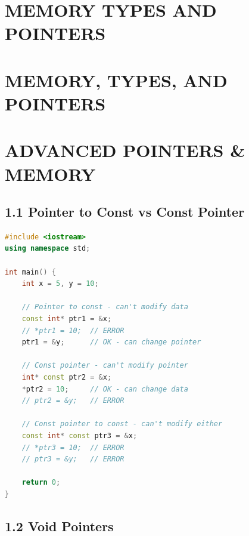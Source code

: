 \hypertarget{memory-types-and-pointers}{%
\chapter{MEMORY TYPES AND POINTERS}\label{memory-types-and-pointers}}

\hypertarget{memory-types-and-pointers-1}{%
\chapter{MEMORY, TYPES, AND
POINTERS}\label{memory-types-and-pointers-1}}

\hypertarget{advanced-pointers-memory}{%
\chapter{ADVANCED POINTERS \& MEMORY}\label{advanced-pointers-memory}}

\hypertarget{pointer-to-const-vs-const-pointer}{%
\section{1.1 Pointer to Const vs Const
Pointer}\label{pointer-to-const-vs-const-pointer}}

\begin{lstlisting}[language={C++}]
#include <iostream>
using namespace std;

int main() {
    int x = 5, y = 10;
    
    // Pointer to const - can't modify data
    const int* ptr1 = &x;
    // *ptr1 = 10;  // ERROR
    ptr1 = &y;      // OK - can change pointer
    
    // Const pointer - can't modify pointer
    int* const ptr2 = &x;
    *ptr2 = 10;     // OK - can change data
    // ptr2 = &y;   // ERROR
    
    // Const pointer to const - can't modify either
    const int* const ptr3 = &x;
    // *ptr3 = 10;  // ERROR
    // ptr3 = &y;   // ERROR
    
    return 0;
}
\end{lstlisting}

\hypertarget{void-pointers}{%
\section{1.2 Void Pointers}\label{void-pointers}}

